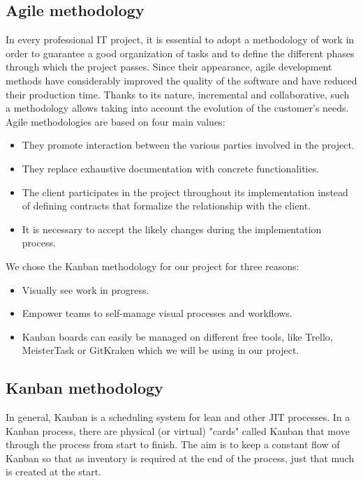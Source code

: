 \begin{spacing}{1.2}
\subsection{Agile methodology}
In every professional IT project, it is essential to adopt a methodology
of work in order to guarantee a good organization of tasks and to define the different phases
through which the project passes.
Since their appearance, agile \cite{agile}  development methods have considerably improved
the quality of the software and have reduced their production time. Thanks to its nature,
incremental and collaborative, such a methodology allows taking into account the evolution
of the customer's needs. Agile methodologies are based on four main values:
\begin{itemize}
	\item They promote interaction between the various parties involved in the project.
\item They replace exhaustive documentation with concrete functionalities.
\item The client participates in the project throughout its implementation instead of defining contracts
that formalize the relationship with the client.
\item It is necessary to accept the likely changes during the implementation process.
\end{itemize}

We chose the Kanban methodology for our project for three reasons:

\begin{itemize}
	\item Visually see work in progress.
	\item Empower teams to self-manage visual processes and workflows.
	\item Kanban boards can easily be managed on different free tools, like Trello, MeisterTask or GitKraken which we will be using in our project.
\end{itemize}



\subsection{Kanban methodology}

In general, Kanban\cite{kanban} is a scheduling system for lean and other JIT processes. In a Kanban process, there are physical (or virtual) "cards" called Kanban that move through the process from start to finish. The aim is to keep a constant flow of Kanban so that as inventory is required at the end of the process, just that much is created at the start.



\end{spacing}
